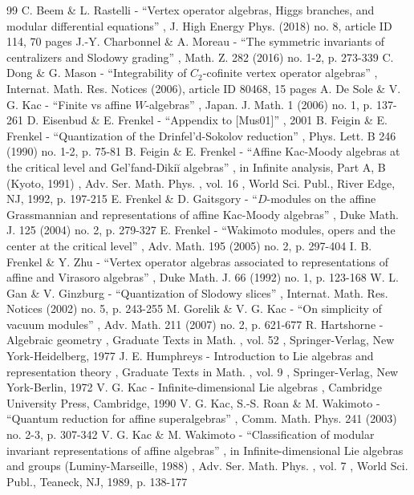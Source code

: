 \documentclass[11pt]{article}
\numberwithin{equation}{section}
\theoremstyle{definition}
\begin{document}
\begin{thebibliography}{99}
 C. Beem \& L. Rastelli - “Vertex operator algebras, Higgs branches, and modular differential equations” , J. High Energy Phys. (2018) no. 8, article ID 114, 70 pages
 J.-Y. Charbonnel \& A. Moreau - “The symmetric invariants of centralizers and Slodowy grading” , Math. Z. 282 (2016) no. 1-2, p. 273-339
 C. Dong \& G. Mason - “Integrability of $C_2$-cofinite vertex operator algebras” , Internat. Math. Res. Notices (2006), article ID 80468, 15 pages
 A. De Sole \& V. G. Kac - “Finite vs affine $W$-algebras” , Japan. J. Math. 1 (2006) no. 1, p. 137-261
 D. Eisenbud \& E. Frenkel - “Appendix to [Mus01]” , 2001
 B. Feigin \& E. Frenkel - “Quantization of the Drinfel’d-Sokolov reduction” , Phys. Lett. B 246 (1990) no. 1-2, p. 75-81
 B. Feigin \& E. Frenkel - “Affine Kac-Moody algebras at the critical level and Gel’fand-Dikiĭ algebras” , in Infinite analysis, Part A, B (Kyoto, 1991) , Adv. Ser. Math. Phys. , vol. 16 , World Sci. Publ., River Edge, NJ, 1992, p. 197-215
 E. Frenkel \& D. Gaitsgory - “$D$-modules on the affine Grassmannian and representations of affine Kac-Moody algebras” , Duke Math. J. 125 (2004) no. 2, p. 279-327
 E. Frenkel - “Wakimoto modules, opers and the center at the critical level” , Adv. Math. 195 (2005) no. 2, p. 297-404
 I. B. Frenkel \& Y. Zhu - “Vertex operator algebras associated to representations of affine and Virasoro algebras” , Duke Math. J. 66 (1992) no. 1, p. 123-168
 W. L. Gan \& V. Ginzburg - “Quantization of Slodowy slices” , Internat. Math. Res. Notices (2002) no. 5, p. 243-255
 M. Gorelik \& V. G. Kac - “On simplicity of vacuum modules” , Adv. Math. 211 (2007) no. 2, p. 621-677
 R. Hartshorne - Algebraic geometry , Graduate Texts in Math. , vol. 52 , Springer-Verlag, New York-Heidelberg, 1977
 J. E. Humphreys - Introduction to Lie algebras and representation theory , Graduate Texts in Math. , vol. 9 , Springer-Verlag, New York-Berlin, 1972
 V. G. Kac - Infinite-dimensional Lie algebras , Cambridge University Press, Cambridge, 1990
 V. G. Kac, S.-S. Roan \& M. Wakimoto - “Quantum reduction for affine superalgebras” , Comm. Math. Phys. 241 (2003) no. 2-3, p. 307-342
 V. G. Kac \& M. Wakimoto - “Classification of modular invariant representations of affine algebras” , in Infinite-dimensional Lie algebras and groups (Luminy-Marseille, 1988) , Adv. Ser. Math. Phys. , vol. 7 , World Sci. Publ., Teaneck, NJ, 1989, p. 138-177

\end{thebibliography}
\end{document}

